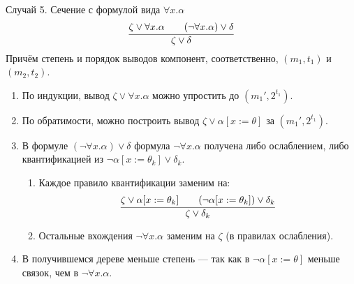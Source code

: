 \documentclass[aspectratio=169]{beamer}
\begin{document}
\begin{frame}{Случай 5. Сечение с формулой вида $\forall x.\alpha$}
\vspace{-0.1cm}$$\infer{\zeta\vee\delta}{\zeta\vee\forall x.\alpha\quad\quad(\neg\forall x.\alpha)\vee\delta}$$\vspace{-0.1cm}
Причём степень и порядок выводов компонент, соответственно, $(m_1,t_1)$ и $(m_2,t_2)$.\vspace{-0.1cm}
\begin{enumerate}
\item По индукции, вывод $\zeta\vee\forall x.\alpha$ можно упростить до $(m_1',2^{t_1})$.
\item По обратимости, можно построить вывод $\zeta\vee\alpha[x := \theta]$ за $(m_1',2^{t_1})$.
\item В формуле $(\neg \forall x. \alpha)\vee\delta$ формула $\neg\forall x.\alpha$ получена
либо ослаблением, либо квантификацией из $\neg\alpha[x := \theta_k]\vee\delta_k$. 
\begin{enumerate}
\item Каждое правило квантификации заменим на:
$$\infer{\zeta\vee\delta_k}{\zeta\vee\alpha[x := \theta_k]\quad\quad(\neg\alpha[x := \theta_k])\vee\delta_k}$$
\item Остальные вхождения $\neg\forall x.\alpha$ заменим на $\zeta$ (в правилах ослабления).
\end{enumerate}
\item В получившемся дереве меньше степень --- так как в $\neg\alpha[x := \theta]$ меньше связок, чем в $\neg\forall x.\alpha$.
\end{enumerate}
\end{frame}
\end{document}

